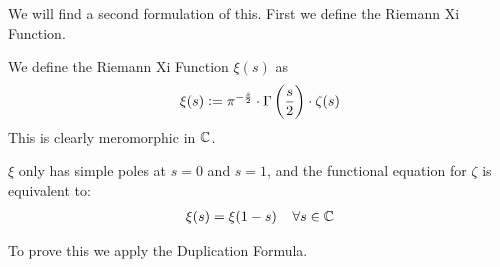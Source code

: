 We will find a second formulation of this. First we define the Riemann Xi Function.




\begin{definition}
We define the Riemann Xi Function $\xi(s)$ as
\begin{align*}
    \xi(s) \vcentcolon = \pi^{-\frac{s}{2}} \cdot \Gamma\left( \frac{s}{2} \right) \cdot \zeta(s)
\end{align*}
This is clearly meromorphic in $\mathbb{C}$.
\end{definition}

\begin{theorem}
$\xi$ only has simple poles at $s= 0$ and $s=1$, and the functional equation for $\zeta$ is equivalent to:
\begin{align*}
    \xi(s) = \xi(1-s) \;\;\;\; \forall s \in \mathbb{C}
\end{align*}
\end{theorem}

To prove this we apply the Duplication Formula.

